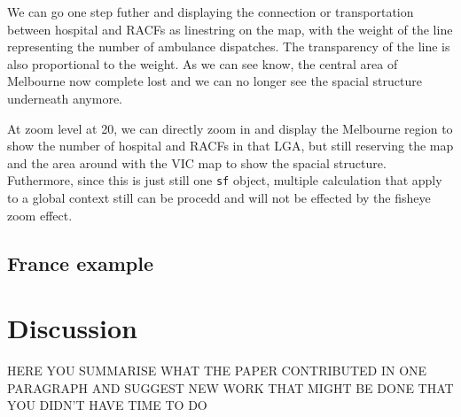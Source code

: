 We can go one step futher and displaying the connection or transportation between hospital and RACFs as linestring on the map, with the weight of the line representing the number of ambulance dispatches. The transparency of the line is also proportional to the weight. As we can see know, the central area of Melbourne now complete lost and we can no longer see the spacial structure underneath anymore.


At zoom level at 20, we can directly zoom in and display the Melbourne region to show the number of hospital and RACFs in that LGA, but still reserving the map and the area around with the VIC map to show the spacial structure. Futhermore, since this is just still one \texttt{sf} object, multiple calculation that apply to a global context still can be procedd and will not be effected by the fisheye zoom effect.

\subsection{France example}\label{france-example}


\section{Discussion}\label{discussion}

HERE YOU SUMMARISE WHAT THE PAPER CONTRIBUTED IN ONE PARAGRAPH AND SUGGEST NEW WORK THAT MIGHT BE DONE THAT YOU DIDN'T HAVE TIME TO DO



\address{%
Thanh Cuong Nguyen\\
Monash University\\%
Department of Econometrics and Business Statistics\\ Melbourne, Australia\\
%
\url{https://alex-nguyen-vn.github.io}\\%
\textit{ORCiD: \href{https://orcid.org/0000-0000-0000-0000}{0000-0000-0000-0000}}\\%
\href{mailto:thanhcuong10091992@gmail.com}{\nolinkurl{thanhcuong10091992@gmail.com}}%
}

\address{%
Michael Lydeamore\\
Monash University\\%
Department of Econometrics and Business Statistics\\ Melbourne, Australia\\
%
\url{https://www.michaellydeamore.com}\\%
\textit{ORCiD: \href{https://orcid.org/0000-0001-6515-827X}{0000-0001-6515-827X}}\\%
\href{mailto:michael.lydeamore@monash.edu}{\nolinkurl{michael.lydeamore@monash.edu}}%
}


